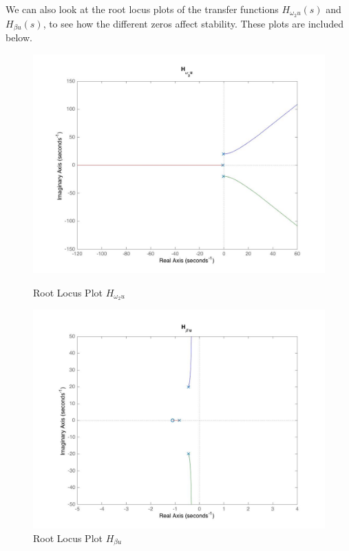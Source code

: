 \documentclass[11pt,titlepage]{article}
\begin{document}
       We can also look at the root locus plots of the transfer functions $H_{\omega_{2}u}(s)$ and $H_{\beta u}(s)$, to see how the different zeros affect stability. These plots are included below.
       \begin{figure}[H]
            \centering
            \begin{minipage}{.5\textwidth}
                \centering
              	\includegraphics[trim={6cm 0 0 0},clip,origin=c,scale=0.25]{rlplot_w2}
            	\caption{Root Locus Plot $H_{\omega_{2}u}$}
           	\label{fig:disc_sys}
            \end{minipage}%
            \begin{minipage}{.5\textwidth}
                \centering
                \includegraphics[trim={6cm 0 0 0},clip,origin=c,scale=0.25]{rlplot_B}
            \caption{Root Locus Plot $H_{\beta u}$}
            \label{fig:disc_sys}
            \end{minipage}%
       \end{figure}
       
\end{document}
